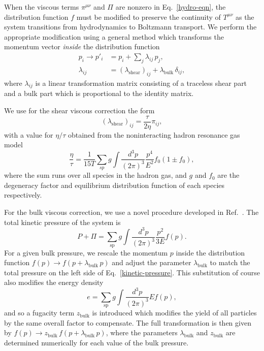 \documentclass[aps,prc,reprint,amsmath,nofootinbib]{revtex4-1}
\begin{document}
When the viscous terms $\pi^{\mu\nu}$ and $\Pi$ are nonzero in Eq.~\eqref{hydro-eqn}, the distribution function $f$ must be modified to preserve the continuity of $T^{\mu\nu}$ as the system transitions from hydrodynamics to Boltzmann transport.
We perform the appropriate modification using a general method which transforms the momentum vector \emph{inside} the distribution function \cite{Pratt:2010jt}
\begin{align}
  \label{viscous_correction}
  p_i \rightarrow p'_i &= p_i + \sum\limits_j \lambda_{ij}\, p_j,\\
  \lambda_{ij} &= (\lambda_\mathrm{shear})_{ij} + \lambda_\mathrm{bulk}\, \delta_{ij},
\end{align}
where $\lambda_{ij}$ is a linear transformation matrix consisting of a traceless shear part and a bulk part which is proportional to the identity matrix.

We use for the shear viscous correction the form \cite{Pratt:2010jt}
\begin{equation}
  (\lambda_\mathrm{shear})_{ij} = \frac{\tau}{2 \eta} \pi_{ij},
\end{equation}
with a value for $\eta/\tau$ obtained from the noninteracting hadron resonance gas model
\begin{equation}
  \frac{\eta}{\tau} = \frac{1}{15 T} \sum\limits_{sp} g \int \frac{d^3p}{(2\pi)^3}\frac{p^4}{E^2} f_0 (1 \pm f_0),
\end{equation}
where the sum runs over all species in the hadron gas, and $g$ and $f_0$ are the degeneracy factor and equilibrium distribution function of each species respectively.

For the bulk viscous correction, we use a novel procedure developed in Ref.~\cite{Bernhard:2018hnz}.
The total kinetic pressure of the system is
\begin{equation}
  \label{kinetic-pressure}
  P + \Pi = \sum\limits_\mathrm{sp} g \int \frac{d^3p}{(2\pi)^3} \frac{p^2}{3E} f(p).
\end{equation}
For a given bulk pressure, we rescale the momentum $p$ inside the distribution function $f(p) \rightarrow f(p + \lambda_\mathrm{bulk}\, p)$ and adjust the parameter $\lambda_\mathrm{bulk}$ to match the total pressure on the left side of Eq.~\eqref{kinetic-pressure}.
This substitution of course also modifies the energy density
\begin{equation}
  e = \sum\limits_\mathrm{sp} g \int \frac{d^3p}{(2 \pi)^3} E f(p),
\end{equation}
and so a fugacity term $z_\mathrm{bulk}$ is introduced which modifies the yield of all particles by the same overall factor to compensate.
The full transformation is then given by $f(p) \rightarrow z_\mathrm{bulk}\, f(p + \lambda_\mathrm{bulk}\, p)$, where the parameters $\lambda_\mathrm{bulk}$ and $z_\mathrm{bulk}$ are determined numerically for each value of the bulk pressure.
\end{document}
